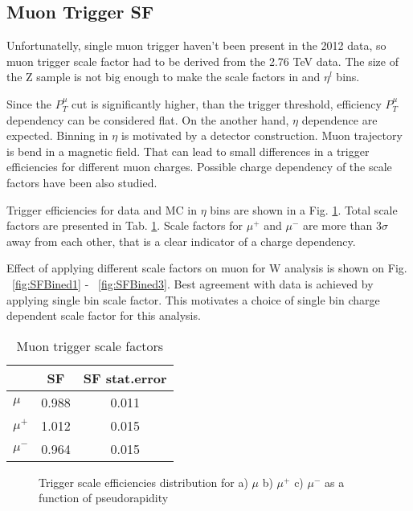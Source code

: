 \subsection{Muon Trigger SF}
Unfortunatelly, single muon trigger haven't been present in the 2012 data, so muon trigger scale factor had to be derived from the 2.76 TeV data. The size of the Z sample is not big enough to make the scale factors in \ptl and $\eta^{l}$ bins. 

Since the $P_{T}^{\mu}$ cut is significantly higher, than the trigger threshold, efficiency $P_{T}^{\mu}$ dependency can be considered flat. On the another hand, $\eta$ dependence are expected. Binning in $\eta$ is motivated by a detector construction. Muon trajectory is bend in a magnetic field. That can lead to small differences in a trigger efficiencies for different muon charges. Possible charge dependency of the scale factors have been also studied. 

Trigger efficiencies for data and MC in $\eta$ bins are shown in a Fig. \ref{fig:MuSF}. Total scale factors are presented in Tab. \ref{tab:MuonSF}. Scale factors for $\mu^{+}$ and $\mu^{-}$ are more than 3$\sigma$ away from each other, that is a clear indicator of a charge dependency. 

Effect of applying different scale factors on muon for W analysis is shown on Fig. ~\ref{fig:SFBined1} - ~\ref{fig:SFBined3}. Best agreement with data is achieved by applying single bin scale factor. This motivates a choice of single bin charge dependent scale factor for this analysis. 

\begin{table}[!tbp]
    \caption{Muon trigger scale factors}
	\label{tab:MuonSF}
	\begin{center}
		\begin{tabular}{|l | c | c|}
		\hline
		& SF & SF stat.error\\
		\hline
		\hline
		$\mu$ & 0.988 & 0.011\\
		\hline
		$\mu^{+}$ & 1.012 & 0.015\\
		$\mu^{-}$ & 0.964 & 0.015\\
		\hline
		\end{tabular}
		\end{center}
\end{table}

\begin{figure}[!tbp]
\endminipage\hfill
{}
\endminipage\hfill
{}%
\endminipage
\caption{Trigger scale efficiencies distribution for a) $\mu$ b) $\mu^{+}$  c) $\mu^{-}$ as a function of pseudorapidity}
\label{fig:MuSF}
\end{figure}

